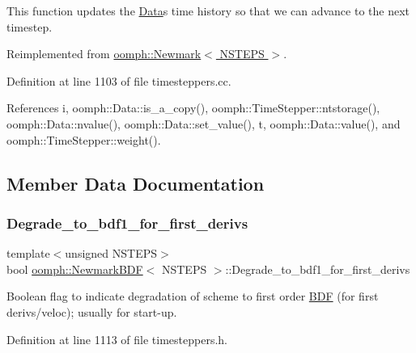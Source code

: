 This function updates the \hyperlink{classoomph_1_1Data}{Data}\textquotesingle{}s time history so that we can advance to the next timestep. 



Reimplemented from \hyperlink{classoomph_1_1Newmark_a3f8606d569f947669006b9b079ac4c82}{oomph\+::\+Newmark$<$ N\+S\+T\+E\+P\+S $>$}.



Definition at line 1103 of file timesteppers.\+cc.



References i, oomph\+::\+Data\+::is\+\_\+a\+\_\+copy(), oomph\+::\+Time\+Stepper\+::ntstorage(), oomph\+::\+Data\+::nvalue(), oomph\+::\+Data\+::set\+\_\+value(), t, oomph\+::\+Data\+::value(), and oomph\+::\+Time\+Stepper\+::weight().



\subsection{Member Data Documentation}
\mbox{\label{classoomph_1_1NewmarkBDF_a772c06965e20fdbe72520024c845131a}} 
\subsubsection{\texorpdfstring{Degrade\+\_\+to\+\_\+bdf1\+\_\+for\+\_\+first\+\_\+derivs}{Degrade\_to\_bdf1\_for\_first\_derivs}}
{\footnotesize\ttfamily template$<$unsigned N\+S\+T\+E\+PS$>$ \\
bool \hyperlink{classoomph_1_1NewmarkBDF}{oomph\+::\+Newmark\+B\+DF}$<$ N\+S\+T\+E\+PS $>$\+::Degrade\+\_\+to\+\_\+bdf1\+\_\+for\+\_\+first\+\_\+derivs\hspace{0.3cm}{\ttfamily [private]}}



Boolean flag to indicate degradation of scheme to first order \hyperlink{classoomph_1_1BDF}{B\+DF} (for first derivs/veloc); usually for start-\/up. 



Definition at line 1113 of file timesteppers.\+h.

